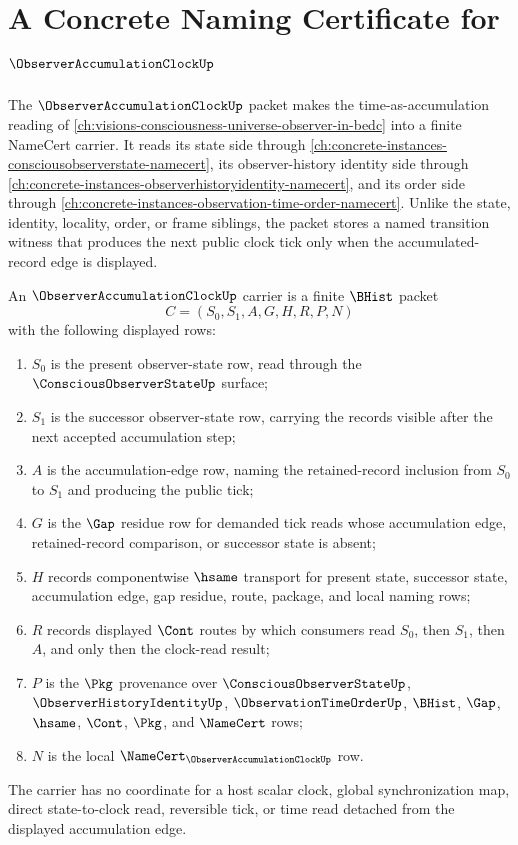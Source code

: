 \chapter{A Concrete Naming Certificate for $\ObserverAccumulationClockUp$}
\label{ch:concrete-instances-observer-accumulation-clock-namecert}

The $\ObserverAccumulationClockUp$ packet makes the time-as-accumulation reading of \autoref{ch:visions-consciousness-universe-observer-in-bedc} into a finite NameCert carrier. It reads its state side through \autoref{ch:concrete-instances-consciousobserverstate-namecert}, its observer-history identity side through \autoref{ch:concrete-instances-observerhistoryidentity-namecert}, and its order side through \autoref{ch:concrete-instances-observation-time-order-namecert}. Unlike the state, identity, locality, order, or frame siblings, the packet stores a named transition witness that produces the next public clock tick only when the accumulated-record edge is displayed.

\begin{definition}
\label{def:observer-accumulation-clock-carrier}
An $\ObserverAccumulationClockUp$ carrier is a finite $\BHist$ packet
$$
C=(S_0,S_1,A,G,H,R,P,N)
$$
with the following displayed rows:
\begin{enumerate}
\item $S_0$ is the present observer-state row, read through the $\ConsciousObserverStateUp$ surface;
\item $S_1$ is the successor observer-state row, carrying the records visible after the next accepted accumulation step;
\item $A$ is the accumulation-edge row, naming the retained-record inclusion from $S_0$ to $S_1$ and producing the public tick;
\item $G$ is the $\Gap$ residue row for demanded tick reads whose accumulation edge, retained-record comparison, or successor state is absent;
\item $H$ records componentwise $\hsame$ transport for present state, successor state, accumulation edge, gap residue, route, package, and local naming rows;
\item $R$ records displayed $\Cont$ routes by which consumers read $S_0$, then $S_1$, then $A$, and only then the clock-read result;
\item $P$ is the $\Pkg$ provenance over $\ConsciousObserverStateUp$, $\ObserverHistoryIdentityUp$, $\ObservationTimeOrderUp$, $\BHist$, $\Gap$, $\hsame$, $\Cont$, $\Pkg$, and $\NameCert$ rows;
\item $N$ is the local $\NameCert_{\ObserverAccumulationClockUp}$ row.
\end{enumerate}
The carrier has no coordinate for a host scalar clock, global synchronization map, direct state-to-clock read, reversible tick, or time read detached from the displayed accumulation edge.
\end{definition}

